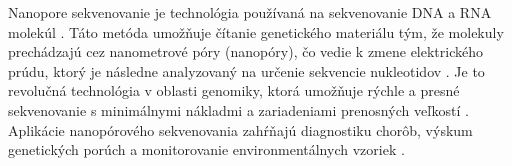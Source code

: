 Nanopore sekvenovanie je technológia používaná na sekvenovanie DNA a RNA molekúl \cite{Zheng2023Nanopore}. Táto metóda umožňuje čítanie genetického materiálu tým, že molekuly prechádzajú cez nanometrové póry (nanopóry), čo vedie k zmene elektrického prúdu, ktorý je následne analyzovaný na určenie sekvencie nukleotidov \cite{Zheng2023Nanopore}.
Je to revolučná technológia v oblasti genomiky, ktorá umožňuje rýchle a presné sekvenovanie s minimálnymi nákladmi a zariadeniami prenosných veľkostí \cite{Zheng2023Nanopore}.
Aplikácie nanopórového sekvenovania zahŕňajú diagnostiku chorôb, výskum genetických porúch a monitorovanie environmentálnych vzoriek \cite{Zheng2023Nanopore}.
